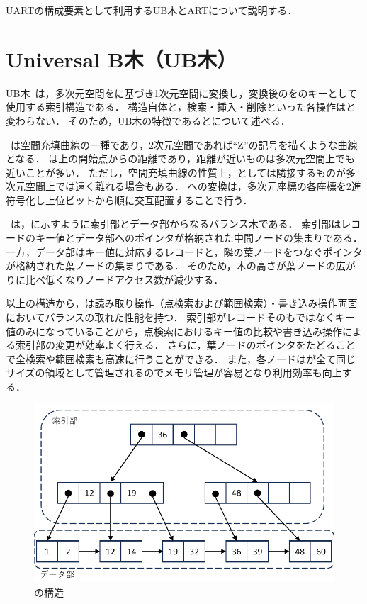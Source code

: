 UARTの構成要素として利用するUB木とARTについて説明する．

\section{Universal B木（UB木）}

UB木~\cite{vldb:ramsak2000}は，多次元空間を\ZCurve に基づき1次元空間に変換し，変換後の\ZValue を\BTree のキーとして使用する索引構造である．
構造自体と，検索・挿入・削除といった各操作は\BTree と変わらない．
そのため，UB木の特徴である\ZCurve と\BTree について述べる．

\ZCurve ~\cite{acm:Gaede1998}は空間充填曲線の一種であり，2次元空間であれば``Z''の記号を描くような曲線となる．
\ZValue は\ZCurve 上の開始点からの距離であり，距離が近いものは多次元空間上でも近いことが多い．
ただし，空間充填曲線の性質上，\ZValue としては隣接するものが多次元空間上では遠く離れる場合もある．
\ZValue への変換は，多次元座標の各座標を2進符号化し上位ビットから順に交互配置することで行う．

\BTree ~\cite{book:Kitagawa1996}は，\Fig{\ref{fig:bptree}}に示すように索引部とデータ部からなるバランス木である．
索引部はレコードのキー値とデータ部へのポインタが格納された中間ノードの集まりである．
一方，データ部はキー値に対応するレコードと，隣の葉ノードをつなぐポインタが格納された葉ノードの集まりである．
そのため，木の高さが葉ノードの広がりに比べ低くなりノードアクセス数が減少する．

以上の構造から，\BTree は読み取り操作（点検索および範囲検索）・書き込み操作両面においてバランスの取れた性能を持つ．
索引部がレコードそのもではなくキー値のみになっていることから，点検索におけるキー値の比較や書き込み操作による索引部の変更が効率よく行える．
さらに，葉ノードのポインタをたどることで全検索や範囲検索も高速に行うことができる．
また，各ノードはが全て同じサイズの領域として管理されるのでメモリ管理が容易となり利用効率も向上する．

\begin{figure}[tb]
  \centering
  \includegraphics{./figures/fig_bptree.pdf}
  \caption{\BTree{}の構造}
  \label{fig:bptree}
\end{figure}

